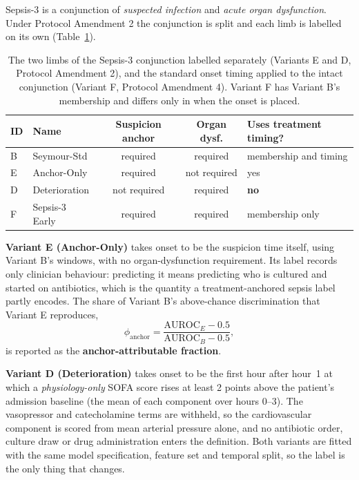 Sepsis-3 is a conjunction of \emph{suspected infection} and \emph{acute organ
dysfunction}. Under Protocol Amendment 2 the conjunction is split and each limb
is labelled on its own (Table~\ref{tab:alt_label_variants}).

\begin{table}[H]
    \centering\small
    \begin{tabular}{llccp{3.1cm}}
        \toprule
        \textbf{ID} & \textbf{Name} & \textbf{Suspicion anchor}
        & \textbf{Organ dysf.} & \textbf{Uses treatment timing?} \\
        \midrule
        B & Seymour-Std    & required     & required     & \raggedright membership and timing\tabularnewline
        E & Anchor-Only    & required     & not required & \raggedright yes\tabularnewline
        D & Deterioration  & not required & required     & \raggedright \textbf{no}\tabularnewline
        F & Sepsis-3 Early & required     & required     & \raggedright membership only\tabularnewline
        \bottomrule
    \end{tabular}
    \caption{The two limbs of the Sepsis-3 conjunction labelled separately
    (Variants E and D, Protocol Amendment 2), and the standard onset timing
    applied to the intact conjunction (Variant F, Protocol Amendment 4).
    Variant F has Variant B's membership and differs only in when the onset is
    placed.}
    \label{tab:alt_label_variants}
\end{table}

\textbf{Variant E (Anchor-Only)} takes onset to be the suspicion time itself,
using Variant B's windows, with no organ-dysfunction requirement. Its label
records only clinician behaviour: predicting it means predicting who is
cultured and started on antibiotics, which is the quantity a treatment-anchored
sepsis label partly encodes. The share of Variant B's above-chance
discrimination that Variant E reproduces,
\begin{equation}
    \phi_{\text{anchor}}
    = \frac{\mathrm{AUROC}_E - 0.5}{\mathrm{AUROC}_B - 0.5},
    \label{eq:anchor_fraction}
\end{equation}
is reported as the \textbf{anchor-attributable fraction}.

\textbf{Variant D (Deterioration)} takes onset to be the first hour after hour~1
at which a \emph{physiology-only} SOFA score rises at least 2 points above the
patient's admission baseline (the mean of each component over hours 0--3). The
vasopressor and catecholamine terms are withheld, so the cardiovascular
component is scored from mean arterial pressure alone, and no antibiotic order,
culture draw or drug administration enters the definition. Both variants are
fitted with the same model specification, feature set and temporal split, so
the label is the only thing that changes.

